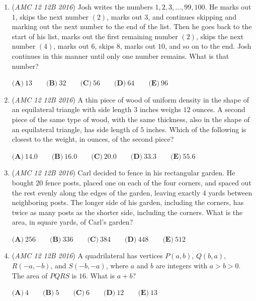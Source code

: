 \begin{enumerate}
 $\textbf{(A)}\ 4\qquad\textbf{(B)}\ 6\qquad\textbf{(C)}\ 8\qquad\textbf{(D)}\ 10\qquad\textbf{(E)}\ 16$


	\item (\textit{AMC 12 12B 2016}) Josh writes the numbers $1,2,3,\dots,99,100$. He marks out $1$, skips the next number $(2)$, marks out $3$, and continues skipping and marking out the next number to the end of the list. Then he goes back to the start of his list, marks out the first remaining number $(2)$, skips the next number $(4)$, marks out $6$, skips $8$, marks out $10$, and so on to the end. Josh continues in this manner until only one number remains. What is that number?


 $\textbf{(A)}\ 13 \qquad \textbf{(B)}\ 32 \qquad \textbf{(C)}\ 56 \qquad \textbf{(D)}\ 64 \qquad \textbf{(E)}\ 96$


	\item (\textit{AMC 12 12B 2016}) A thin piece of wood of uniform density in the shape of an equilateral triangle with side length $3$ inches weighs $12$ ounces. A second piece of the same type of wood, with the same thickness, also in the shape of an equilateral triangle, has side length of $5$ inches. Which of the following is closest to the weight, in ounces, of the second piece?


 $\textbf{(A)}\ 14.0\qquad\textbf{(B)}\ 16.0\qquad\textbf{(C)}\ 20.0\qquad\textbf{(D)}\ 33.3\qquad\textbf{(E)}\ 55.6$


	\item (\textit{AMC 12 12B 2016}) Carl decided to fence in his rectangular garden. He bought $20$ fence posts, placed one on each of the four corners, and spaced out the rest evenly along the edges of the garden, leaving exactly $4$ yards between neighboring posts. The longer side of his garden, including the corners, has twice as many posts as the shorter side, including the corners. What is the area, in square yards, of Carl’s garden?


 $\textbf{(A)}\ 256\qquad\textbf{(B)}\ 336\qquad\textbf{(C)}\ 384\qquad\textbf{(D)}\ 448\qquad\textbf{(E)}\ 512$


	\item (\textit{AMC 12 12B 2016}) A quadrilateral has vertices $P(a,b)$, $Q(b,a)$, $R(-a, -b)$, and $S(-b, -a)$, where $a$ and $b$ are integers with $a>b>0$. The area of $PQRS$ is $16$. What is $a+b$?


 $\textbf{(A)}\ 4 \qquad\textbf{(B)}\ 5 \qquad\textbf{(C)}\ 6 \qquad\textbf{(D)}\ 12  \qquad\textbf{(E)}\ 13$



\end{enumerate}
